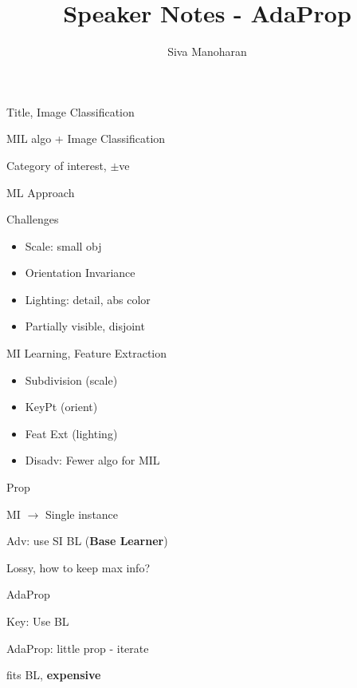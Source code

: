 \documentclass[12pt,handout]{beamer}
\author{Siva Manoharan}
\title{Speaker Notes - AdaProp}
\newenvironment{wideitemize}{\itemize\addtolength{\itemsep}{20pt}}{\enditemize}
\begin{document}
\huge

\begin{frame}{Title, Image Classification}
    \begin{wideitemize}
    \item MIL algo + Image Classification
    \item Category of interest, $\pm$ve
    \item ML Approach
    \end{wideitemize}
\end{frame}

\begin{frame}{Challenges}
    \begin{itemize}
    \item Scale: small obj
    \item Orientation Invariance
    \item Lighting: detail, abs color
    \item Partially visible, disjoint
    \end{itemize}
\end{frame}

\begin{frame}{MI Learning, Feature Extraction}
    \begin{itemize}
    \item Subdivision (scale)
    \item KeyPt (orient)
    \item Feat Ext (lighting)
    \item Disadv: Fewer algo for MIL
    \end{itemize}
\end{frame}

\begin{frame}{Prop}
\begin{wideitemize}
    \item MI $\to$ Single instance
    \item Adv: use SI BL ({\bf Base Learner})
    \item Lossy, how to keep max info?
\end{wideitemize}
\end{frame}

\begin{frame}{AdaProp}
\begin{wideitemize}
    \item Key: Use BL
    \item AdaProp: little prop - iterate
    \item fits BL, {\bf expensive}
\end{wideitemize}
\end{frame}
\end{document}
